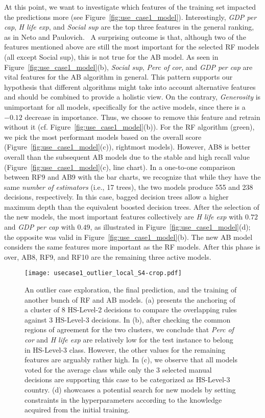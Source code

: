 At this point, we want to investigate which features of the training set impacted the predictions more (see Figure~\ref{fig:use_case1_model}). Interestingly, \emph{GDP per cap}, \emph{H life exp}, and \emph{Social sup} are the top three features in the general ranking, as in Neto and Paulovich.~\cite{Neto2021Multivariate} A surprising outcome is that, although two of the features mentioned above are still the most important for the selected RF models (all except Social sup), this is not true for the AB model. As seen in Figure~\ref{fig:use_case1_model}(b), \emph{Social sup}, \emph{Perc of cor}, and \emph{GDP per cap} are vital features for the AB algorithm in general. This pattern supports our hypothesis that different algorithms might take into account alternative features and should be combined to provide a holistic view. On the contrary, \emph{Generosity} is unimportant for all models, specifically for the active models, since there is a $-0.12$ decrease in importance. Thus, we choose to remove this feature and retrain without it (cf. Figure~\ref{fig:use_case1_model}(b)). For the RF algorithm (green), we pick the most performant models based on the overall score (Figure~\ref{fig:use_case1_model}(c)), rightmost models). However, AB8 is better overall than the subsequent AB models due to the stable and high recall value (Figure~\ref{fig:use_case1_model}(c), line chart). In a one-to-one comparison between RF9 and AB9 with the bar charts, we recognize that while they have the same \emph{number of estimators} (i.e., 17 trees), the two models produce 555 and 238 decisions, respectively. In this case, bagged decision trees allow a higher maximum depth than the equivalent boosted decision trees. After the selection of the new models, the most important features collectively are \emph{H life exp} with $0.72$ and \emph{GDP per cap} with $0.49$, as illustrated in Figure~\ref{fig:use_case1_model}(d); the opposite was valid in Figure~\ref{fig:use_case1_model}(b). The new AB model considers the same features more important as the RF models. After this phase is over, AB8, RF9, and RF10 are the remaining three active models.

\begin{figure*}[tb]
\centering
\texttt{[image: usecase1\_outlier\_local\_S4-crop.pdf]}
\caption{An outlier case exploration, the final prediction, and the training of another bunch of RF and AB models. (a) presents the anchoring of a cluster of 8 HS-Level-2 decisions to compare the overlapping rules against 3 HS-Level-3 decisions. In (b), after checking the common regions of agreement for the two clusters, we conclude that \emph{Perc of cor} and \emph{H life exp} are relatively low for the  test instance to belong in HS-Level-3 class. However, the other values for the remaining features are arguably rather high. In (c), we observe that all models voted for the average class while only the 3 selected manual decisions are supporting this case to be categorized as HS-Level-3 country. (d) showcases a potential search for new models by setting constraints in the hyperparameters according to the knowledge acquired from the initial training.}
\label{fig:use_case1_outlier}
\end{figure*}


